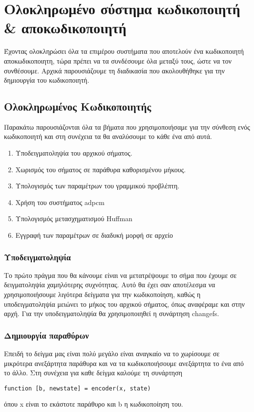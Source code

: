 \chapter{Ολοκληρωμένο σύστημα κωδικοποιητή \& αποκωδικοποιητή}

\par Έχοντας ολοκληρώσει όλα τα επιμέρου συστήματα που αποτελούν ένα κωδικοποιητή 
αποκωδικοποιητη, τώρα πρέπει να τα συνδέσουμε όλα μεταξύ τους, ώστε να τον συνθέσουμε. 
Αρχικά παρουσιάζουμε τη διαδικασία που ακολουθήθηκε για την δημιουργία 
του κωδικοποιητή.
\section{Ολοκληρωμένος Κωδικοποιητής}
\par Παρακάτω παρουσιάζονται όλα τα βήματα που χρησιμοποιήσαμε για την σύνθεση ενός 
κωδικοποιητή και στη συνέχεια τα θα αναλύσουμε το κάθε ένα από αυτά.
\begin{enumerate}
\item Υποδειγματοληψία του αρχικού σήματος.
\item Χωρισμός του σήματος σε παράθυρα καθορισμένου μήκους.
\item Υπολογισμός των παραμέτρων του γραμμικού προβλέπτη.
\item Χρήση του συστήματος adpcm
\item Υπολογισμός μετασχηματισμού Huffman
\item Εγγραφή των παραμέτρων σε διαδυκή μορφή σε αρχείο
\end{enumerate}

\subsection{Υποδειγματοληψία}
\par Το πρώτο πράγμα που θα κάνουμε είναι να μετατρέψουμε το σήμα που έχουμε 
σε δειγματοληψία χαμηλότερης συχνότητας. Αυτό θα έχει σαν αποτέλεσμα να χρησιμοποιήσουμε
λιγότερα δείγματα για την κωδικοποίηση, καθώς η υποδειγματοληψία μειώνει το μήκος 
του αρχικού σήματος, όπως αναφέραμε και στην αρχή. Για την υποδειγματοληψία θα χρησιμοποιηθεί 
η συνάρτηση changefs.

\subsection{Δημιουργία παραθύρων}
\par Επειδή το δείγμα μας είναι πολύ μεγάλο είναι αναγκαίο να το χωρίσουμε 
σε μικρότερα ανεξάρτητα παράθυρα και να τα κωδικοποιήσουμε ανεξάρτητα το ένα από 
το άλλο. Στη συνέχεια για καθε δείγμα καλούμε τη συνάρτηση 
\begin{lstlisting}[style=MyMatlab]
 function [b, newstate] = encoder(x, state)
\end{lstlisting}
όπου x είναι το εκάστοτε παράθυρο και b η κωδικοποίηση του. 

